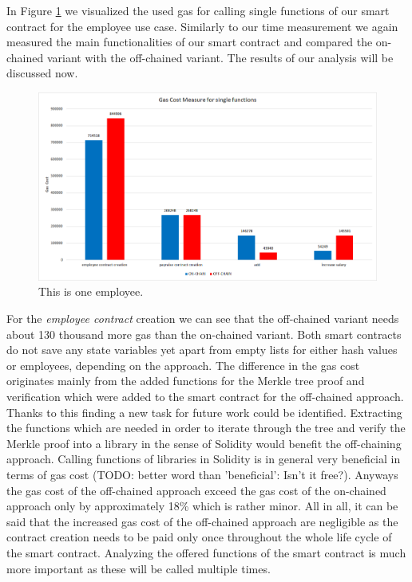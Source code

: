 In Figure \ref{fig:05_gas_cost_single} we visualized the used gas for calling single functions of our smart contract for the employee use case. Similarly to our time measurement we again measured the main functionalities of our smart contract and compared the on-chained variant with the off-chained variant. The results of our analysis will be discussed now.

\begin{figure}[t]
\centering
\includegraphics[width=1.0\textwidth]{images/05_evaluation/05_gas_cost_single.png}
\caption{\label{fig:05_gas_cost_single}This is one employee.}
\end{figure}

For the \textit{employee contract} creation we can see that the off-chained variant needs about 130 thousand more gas than the on-chained variant. Both smart contracts do not save any state variables yet apart from empty lists for either hash values or employees, depending on the approach. The difference in the gas cost originates mainly from the added functions for the Merkle tree proof and verification which were added to the smart contract for the off-chained approach. Thanks to this finding a new task for future work could be identified. Extracting the functions which are needed in order to iterate through the tree and verify the Merkle proof into a library in the sense of Solidity would benefit the off-chaining approach. Calling functions of libraries in Solidity is in general very beneficial in terms of gas cost (TODO: better word than 'beneficial': Isn't it free?). Anyways the gas cost of the off-chained approach exceed the gas cost of the on-chained approach only by approximately 18\% which is rather minor. All in all, it can be said that the increased gas cost of the off-chained approach are negligible as the contract creation needs to be paid only once throughout the whole life cycle of the smart contract. Analyzing the offered functions of the smart contract is much more important as these will be called multiple times.

